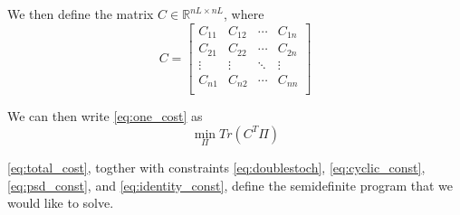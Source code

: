 \documentclass[12pt]{article}
\begin{document}
We then define the matrix $C \in \mathbb{R}^{nL \times nL}$, where
$$C = \begin{bmatrix}
 C_{11} & C_{12} & \cdots & C_{1n} \\
 C_{21} & C_{22} & \cdots & C_{2n} \\
\vdots & \vdots & \ddots & \vdots \\ 
C_{n1} & C_{n2} & \cdots & C_{nn} \\
\end{bmatrix} $$

We can then write \eqref{eq:one_cost} as 
\begin{equation} \label{eq:total_cost}
\min_{\Pi} Tr(C^T \Pi)
\end{equation}

\eqref{eq:total_cost}, togther with constraints \eqref{eq:doublestoch}, \eqref{eq:cyclic_const}, \eqref{eq:psd_const}, and \eqref{eq:identity_const}, define the semidefinite program that we would like to solve. 
\end{document}
